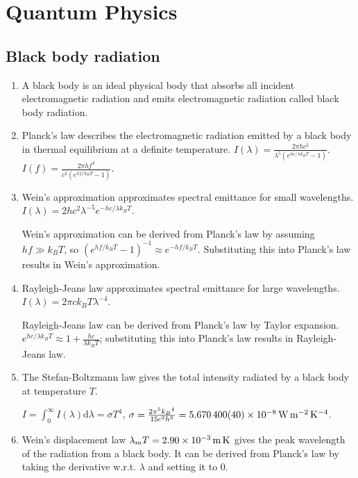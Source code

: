 \chapter{Quantum Physics}
\section{Black body radiation}
\begin{enumerate}
    \item A black body is an ideal physical body that absorbs all incident electromagnetic radiation and emits electromagnetic radiation called black body radiation.
    \item Planck's law describes the electromagnetic radiation emitted by a black body in thermal equilibrium at a definite temperature.
    \(I(\lambda)=\frac{2\pi hc^2}{\lambda^5\left(e^{hc/\lambda k_BT}-1\right)}\).
    \(I(f)=\frac{2\pi hf^3}{c^2\left(e^{hf/k_BT}-1\right)}\).
    \item Wein's approximation approximates spectral emittance for small wavelengths. \(I(\lambda) = 2hc^2\lambda^{-5}e^{-hc/\lambda k_BT}\).
    
    Wein's approximation can be derived from Planck's law by assuming \(hf \gg k_BT\), so \((e^{hf/k_BT} - 1)^{-1} \approx e^{-hf/k_BT}\). Substituting this into Planck's law results in Wein's approximation.
    \item Rayleigh-Jeans law approximates spectral emittance for large wavelengths. \(I(\lambda) = 2\pi ck_BT\lambda^{-4}\).
    
    Rayleigh-Jeans law can be derived from Planck's law by Taylor expansion. \(e^{hc/\lambda k_BT} \approx 1 + \frac{hc}{\lambda k_BT}\); substituting this into Planck's law results in Rayleigh-Jeans law.
    \item The Stefan-Boltzmann law gives the total intensity radiated by a black body at temperature \(T\).
    
    \(I = \int^{\infty}_{0}I(\lambda)\mathrm{d}\lambda = \sigma T^4\), \(\sigma = \frac{2\pi^5{k_B}^4}{15c^2h^3} = \SI{5.670400(40)E-8}{\watt\per\square\meter\per\kelvin\tothe{4}}\).
    \item Wein's displacement law \(\lambda_mT = \SI{2.90E-3}{\metre\kelvin}\) gives the peak wavelength of the radiation from a black body. It can be derived from Planck's law by taking the derivative w.r.t. \(\lambda\) and setting it to 0.
\end{enumerate}
